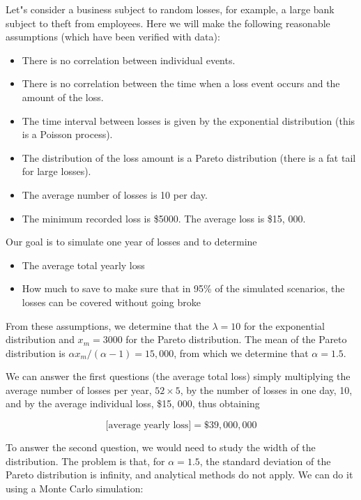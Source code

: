 \documentclass[justified, sixbynine]{tufte-book}
\theoremstyle{plain}%
\newtheorem * {corollary}{Corollary}
\theoremstyle{definition}
\theoremstyle{remark}
\newtheorem * {remark}{Remark}
\newtheorem * {note}{Note}
\begin{document}
\begin{fullwidth}
Let"s consider a business subject to random losses, for example, a large bank subject to theft from employees.
Here we will make the following reasonable assumptions (which have been verified with data):
\begin{itemize}
\item There is no correlation between individual events.
\item There is no correlation between the time when a loss event occurs and the amount of the loss.
\item The time interval between losses is given by the exponential distribution (this is a Poisson process).
\item The distribution of the loss amount is a Pareto distribution (there is a fat tail for large losses).
\item The average number of losses is 10 per day.
\item The minimum recorded loss is \$5000. The average loss is \$15, 000.
\end{itemize}

Our goal is to simulate one year of losses and to determine

\begin{itemize}
\item The average total yearly loss
\item How much to save to make sure that in 95\% of the simulated scenarios, the losses can be covered without going broke
\end{itemize}

From these assumptions, we determine that the $\lambda=10$ for the exponential distribution and $x_m=3000$ for the Pareto distribution. The mean of the Pareto distribution is $\alpha x_m/(\alpha-1) = 15, 000$, from which we determine that $\alpha = 1.5$.

We can answer the first questions (the average total loss) simply multiplying the average number of losses per year, $52\times5$, by the number of losses in one day, 10, and by the average individual loss, \$15, 000, thus obtaining

\begin{equation}
\textrm{[average yearly loss]} = \$39, 000, 000
\end{equation}

To answer the second question, we would need to study the width of the distribution. The problem is that, for $\alpha=1.5$, the standard deviation of the Pareto distribution is infinity, and analytical methods do not apply. We can do it using a Monte Carlo simulation:



\end{fullwidth}
\end{document}
